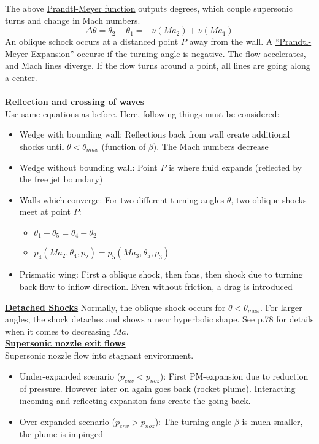\documentclass[8pt, landscape, fleqn]{scrartcl}
\begin{document}
\begin{multicols*}{3}
The above \underline{Prandtl-Meyer function} outputs degrees, which couple supersonic turns and change in Mach numbers.
\begin{equation*}
    \Delta \theta = \theta_2 - \theta_1 = -\nu(Ma_2) + \nu(Ma_1)
\end{equation*}
An oblique schock occurs at a distanced point $P$ away from the wall. A \underline{``Prandtl-Meyer Expansion''} occurse if the turning angle is negative. The flow accelerates, and Mach lines diverge. If the flow turns around a point, all lines are going along a center. \\ \\
\underline{\textbf{Reflection and crossing of waves}} \\
Use same equations as before. Here, following things must be considered:
\begin{itemize}
    \item Wedge with bounding wall: Reflections back from wall create additional shocks until $\theta < \theta_{max}$ (function of $\beta$). The Mach numbers decrease
    \item Wedge without bounding wall: Point $P$ is where fluid expands (reflected by the free jet boundary)
    \item Walls which converge: For two different turning angles $\theta$, two oblique shocks meet at point $P$:
    \begin{itemize}
        \item $\theta_1-\theta_5 = \theta_4 - \theta_2$
        \item $p_4(Ma_2, \theta_4, p_2) = p_5(Ma_3, \theta_5, p_3)$
    \end{itemize}
    \item Prismatic wing: First a oblique shock, then fans, then shock due to turning back flow to inflow direction. Even without friction, a drag is introduced
\end{itemize}
\underline{\textbf{Detached Shocks}}
Normally, the oblique shock occurs for $\theta < \theta_{max}$. For larger angles, the shock detaches and shows a near hyperbolic shape. See p.78 for details when it comes to decreasing $Ma$. \\

\underline{\textbf{Supersonic nozzle exit flows}} \\
Supersonic nozzle flow into stagnant environment.
\begin{itemize}
    \item Under-expanded scenario ($p_{env}<p_{noz}$): First PM-expansion due to reduction of pressure. However later on again goes back (rocket plume). Interacting incoming and reflecting expansion fans create the going back.
    \item Over-expanded scenario ($p_{env}>p_{noz}$): The turning angle $\beta$ is much smaller, the plume is impinged
\end{itemize}


\end{multicols*}
\end{document}
